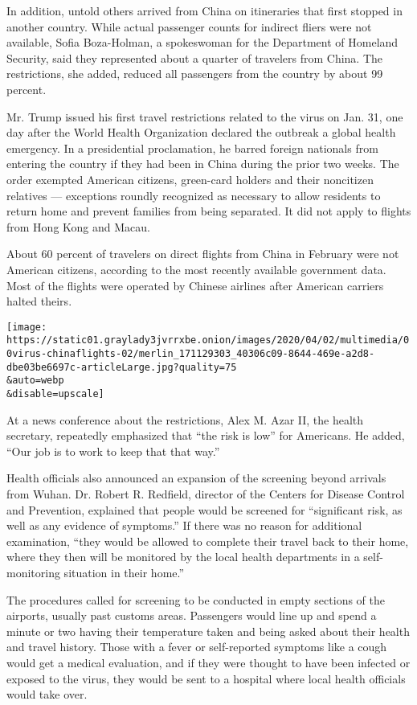 In addition, untold others arrived from China on itineraries that first
stopped in another country. While actual passenger counts for indirect
fliers were not available, Sofia Boza-Holman, a spokeswoman for the
Department of Homeland Security, said they represented about a quarter
of travelers from China. The restrictions, she added, reduced all
passengers from the country by about 99 percent.

Mr. Trump issued his first travel restrictions related to the virus on
Jan. 31, one day after the World Health Organization declared the
outbreak a global health emergency. In a presidential proclamation, he
barred foreign nationals from entering the country if they had been in
China during the prior two weeks. The order exempted American citizens,
green-card holders and their noncitizen relatives --- exceptions roundly
recognized as necessary to allow residents to return home and prevent
families from being separated. It did not apply to flights from Hong
Kong and Macau.

About 60 percent of travelers on direct flights from China in February
were not American citizens, according to the most recently available
government data. Most of the flights were operated by Chinese airlines
after American carriers halted theirs.

\texttt{[image: https://static01.graylady3jvrrxbe.onion/images/2020/04/02/multimedia/00virus-chinaflights-02/merlin\_171129303\_40306c09-8644-469e-a2d8-dbe03be6697c-articleLarge.jpg?quality=75\\\&auto=webp\\\&disable=upscale]}

At a news conference about the restrictions, Alex M. Azar II, the health
secretary, repeatedly emphasized that ``the risk is low'' for Americans.
He added, ``Our job is to work to keep that that way.''

Health officials also announced an expansion of the screening beyond
arrivals from Wuhan. Dr. Robert R. Redfield, director of the Centers for
Disease Control and Prevention, explained that people would be screened
for ``significant risk, as well as any evidence of symptoms.'' If there
was no reason for additional examination, ``they would be allowed to
complete their travel back to their home, where they then will be
monitored by the local health departments in a self-monitoring situation
in their home.''

The procedures called for screening to be conducted in empty sections of
the airports, usually past customs areas. Passengers would line up and
spend a minute or two having their temperature taken and being asked
about their health and travel history. Those with a fever or
self-reported symptoms like a cough would get a medical evaluation, and
if they were thought to have been infected or exposed to the virus, they
would be sent to a hospital where local health officials would take
over.

